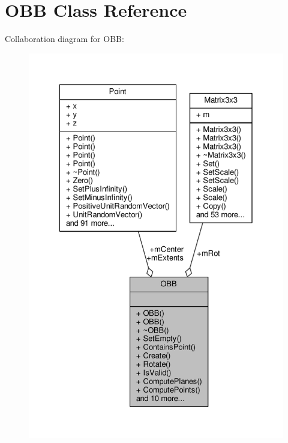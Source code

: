 \hypertarget{classOBB}{}\section{O\+BB Class Reference}
\label{classOBB}


Collaboration diagram for O\+BB\+:
\nopagebreak
\begin{figure}[H]
\begin{center}
\leavevmode
\includegraphics[width=328pt]{db/d9c/classOBB__coll__graph}
\end{center}
\end{figure}

